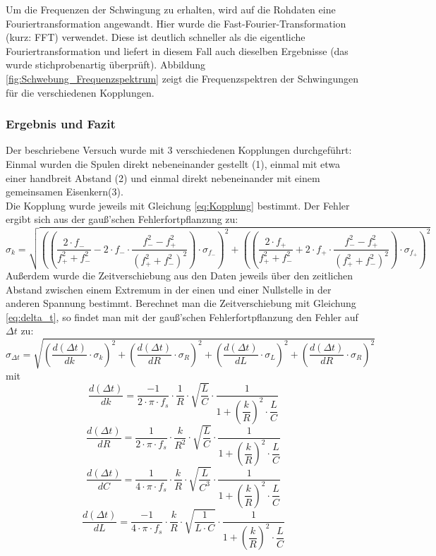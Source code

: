 \documentclass[12pt,a4paper]{article}
\begin{document}
Um die Frequenzen der Schwingung zu erhalten, wird auf die Rohdaten eine Fouriertransformation angewandt. Hier wurde die Fast-Fourier-Transformation (kurz: FFT) verwendet. Diese ist deutlich schneller als die eigentliche Fouriertransformation und liefert in diesem Fall auch dieselben Ergebnisse (das wurde stichprobenartig überprüft). Abbildung \ref{fig:Schwebung_Frequenzspektrum} zeigt die Frequenzspektren der Schwingungen für die verschiedenen Kopplungen.

\subsubsection{Ergebnis und Fazit}
Der beschriebene Versuch wurde mit 3 verschiedenen Kopplungen durchgeführt: Einmal wurden die Spulen direkt nebeneinander gestellt (1), einmal mit etwa einer handbreit Abstand (2) und einmal direkt nebeneinander mit einem gemeinsamen Eisenkern(3). \\
Die Kopplung wurde jeweils mit Gleichung \ref{eq:Kopplung} bestimmt. Der Fehler ergibt sich aus der gauß'schen Fehlerfortpflanzung zu:
\begin{equation}
\sigma_k = \sqrt{\left( \left( \dfrac{2 \cdot f_-}{f_+^2 + f_-^2} - 2 \cdot f_- \cdot \dfrac{f_-^2 - f_+^2}{(f_+^2 + f_-^2)^2} \right) \cdot \sigma_{f_-} \right)^2 + \left( \left( \dfrac{2 \cdot f_+}{f_+^2 + f_-^2} + 2 \cdot f_+ \cdot \dfrac{f_-^2 - f_+^2}{(f_+^2 + f_-^2)^2} \right) \cdot \sigma_{f_+} \right)^2}
\label{eq:Kopplung_k}
\end{equation}
Außerdem wurde die Zeitverschiebung aus den Daten jeweils über den zeitlichen Abstand zwischen einem Extremum in der einen und einer Nullstelle in der anderen Spannung bestimmt. Berechnet man die Zeitverschiebung mit Gleichung \ref{eq:delta_t}, so findet man mit der gauß'schen Fehlerfortpflanzung den Fehler auf $\Delta t$ zu:
\begin{equation}
\sigma_{\Delta t} = \sqrt{\left( \dfrac{d(\Delta t)}{dk} \cdot \sigma_k \right)^2 + \left( \dfrac{d(\Delta t)}{dR} \cdot \sigma_R \right)^2 + \left( \dfrac{d(\Delta t)}{dL} \cdot \sigma_L \right)^2 + \left( \dfrac{d(\Delta t)}{dR} \cdot \sigma_R \right)^2}
\end{equation}
mit
\[\dfrac{d(\Delta t)}{dk} = \dfrac{-1}{2 \cdot \pi \cdot f_s} \cdot \dfrac{1}{R} \cdot \sqrt{\dfrac{L}{C}} \cdot \dfrac{1}{1 + \left( \dfrac{k}{R} \right)^2 \cdot \dfrac{L}{C}} \]
\[\dfrac{d(\Delta t)}{dR} = \dfrac{1}{2 \cdot \pi \cdot f_s} \cdot \dfrac{k}{R^2} \cdot \sqrt{\dfrac{L}{C}} \cdot \dfrac{1}{1 + \left( \dfrac{k}{R} \right)^2 \cdot \dfrac{L}{C}} \]
\[\dfrac{d(\Delta t)}{dC} = \dfrac{1}{4 \cdot \pi \cdot f_s} \cdot \dfrac{k}{R} \cdot \sqrt{\dfrac{L}{C^3}} \cdot \dfrac{1}{1 + \left( \dfrac{k}{R} \right)^2 \cdot \dfrac{L}{C}} \]
\[\dfrac{d(\Delta t)}{dL} = \dfrac{-1}{4 \cdot \pi \cdot f_s} \cdot \dfrac{k}{R} \cdot \sqrt{\dfrac{1}{L \cdot C}} \cdot \dfrac{1}{1 + \left( \dfrac{k}{R} \right)^2 \cdot \dfrac{L}{C}} \]
\end{document}
